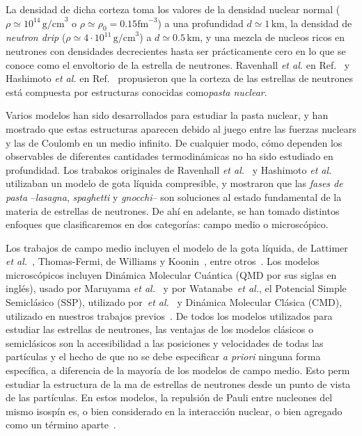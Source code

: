 La densidad de dicha corteza toma los valores de la densidad nuclear normal ($\rho \simeq 10^{14}\,\text{g/cm}^3$ o $ \rho \simeq \rho_0=0.15 \text{fm}^{-3}$) a una profundidad $d \simeq 1\,\text{km}$, la densidad de \emph{neutron drip} ($\rho\simeq 4 \cdot 10^{11}\,\text{g/cm}^3$) a $d\simeq 0.5\,\text{km}$, y una mezcla de nucleos ricos en neutrones con densidades decrecientes hasta ser prácticamente cero en lo que se conoce como el envoltorio de la estrella de neutrones.
Ravenhall \emph{et al.} en Ref.~\cite{ravenhall_structure_1983} y Hashimoto \emph{et al.} en Ref.~\cite{hashimoto_shape_1984} propusieron que la corteza de las estrellas de neutrones está compuesta por estructuras conocidas como\emph{pasta nuclear}.

Varios modelos han sido desarrollados para estudiar la pasta nuclear, y han mostrado que estas estructuras aparecen debido al juego entre las fuerzas nuclears y las de Coulomb en un medio infinito.
De cualquier modo, cómo dependen los observables de diferentes cantidades termodinámicas no ha sido estudiado en profundidad.
Los trabakos originales de Ravenhall \emph{et al.}~\cite{ravenhall_structure_1983} y Hashimoto \emph{et al.}~\cite{hashimoto_shape_1984} utilizaban un modelo de gota líquida compresible, y mostraron que las \emph{fases de pasta}
--\emph{lasagna}, \emph{spaghetti} y \emph{gnocchi}-- son soluciones al estado fundamental de la materia de estrellas de neutrones.
De ahí en adelante, se han tomado distintos enfoques que clasificaremos en dos categorías: campo medio o microscópico.

Los trabajos de campo medio incluyen el modelo de la gota líquida, de Lattimer \emph{et al.}~\cite{page_minimal_2004}, Thomas-Fermi, de Williams y Koonin~\cite{williams_sub-saturation_1985}, entre otros~\cite{oyamatsu_nuclear_1993, lorenz_neutron_1993, cheng_properties_1997, watanabe_thermodynamic_2000, watanabe_electron_2003, nakazato_gyroid_2009}.
Los modelos microscópicos incluyen Dinámica Molecular Cuántica (QMD por sus siglas en inglés), usado por Maruyama \emph{et al.}~\cite{maruyama_quantum_1998, kido_md_2000} y por Watanabe~\emph{et al.}\cite{watanabe_structure_2003}, el Potencial Simple Semiclásico (SSP), utilizado por~\emph{et al.}~\cite{horowitz_nonuniform_2004} y Dinámica Molecular Clásica (CMD), utilizado en nuestros trabajos previos~\cite{dorso_topological_2012}.
De todos los modelos utilizados para estudiar las estrellas de neutrones, las ventajas de los modelos clásicos o semiclásicos son la accesibilidad a las posiciones y velocidades de todas las partículas y el hecho de que no se debe especificar \emph{a priori} ninguna forma específica, a diferencia de la mayoría de los modelos de campo medio.
Esto perm estudiar la estructura de la ma de estrellas de neutrones desde un punto de vista de las partículas.
En estos modelos, la repulsión de Pauli entre nucleones del mismo isospín es, o bien considerado en la interacción nuclear, o bien agregado como un término aparte~\cite{dorso_classical_1988}.

